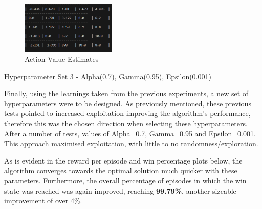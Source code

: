 \documentclass[a4paper,9pt]{scrartcl}
\makeatletter
\renewcommand{\section}{\@startsection{section}{1}{0mm}
  {1.5\baselineskip}
  {1\baselineskip} 
  {\normalfont\Large\bfseries}}
\makeatother
\begin{document}
\begin{figure}[H]
\centering
\includegraphics[width=0.4\textwidth]{images/qvalues(2)(0).png}
\caption{Action Value Estimates}
\label{fig:set2_qvalues}
\end{figure}

\section{Hyperparameter Set 3 - Alpha(0.7), Gamma(0.95), Epsilon(0.001)}

Finally, using the learnings taken from the previous experiments, a new set of hyperparameters were to be designed. As previously mentioned,
these previous tests pointed to increased exploitation improving the algorithm's performance, therefore this was the chosen direction when
selecting these hyperparameters. After a number of tests, values of Alpha=0.7, Gamma=0.95 and Epsilon=0.001. This approach maximised exploitation,
with little to no randomness/exploration.

As is evident in the reward per episode and win percentage plots below, the algorithm converges towards the optimal solution much quicker with these
parameters. Furthermore, the overall percentage of episodes in which the win state was reached was again improved, reaching \textbf{99.79\%},
another sizeable improvement of over 4\%.
\end{document}
